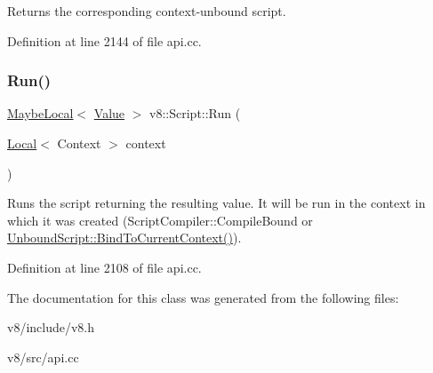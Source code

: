 Returns the corresponding context-\/unbound script. 

Definition at line 2144 of file api.\+cc.

\mbox{\label{classv8_1_1Script_a73a556400c5f6a2a1460a933a815fbf9}} 
\subsubsection{\texorpdfstring{Run()}{Run()}}
{\footnotesize\ttfamily \mbox{\hyperlink{classv8_1_1MaybeLocal}{Maybe\+Local}}$<$ \mbox{\hyperlink{classv8_1_1Value}{Value}} $>$ v8\+::\+Script\+::\+Run (\begin{DoxyParamCaption}\item[{\mbox{\hyperlink{classv8_1_1Local}{Local}}$<$ Context $>$}]{context }\end{DoxyParamCaption})}

Runs the script returning the resulting value. It will be run in the context in which it was created (Script\+Compiler\+::\+Compile\+Bound or \mbox{\hyperlink{classv8_1_1UnboundScript_aeb86867c13854e1baf0756a46958eca0}{Unbound\+Script\+::\+Bind\+To\+Current\+Context()}}). 

Definition at line 2108 of file api.\+cc.



The documentation for this class was generated from the following files\+:\begin{DoxyCompactItemize}
\item 
v8/include/v8.\+h\item 
v8/src/api.\+cc\end{DoxyCompactItemize}
